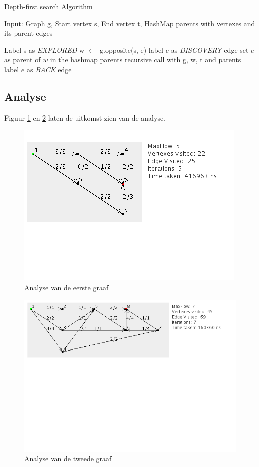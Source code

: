 \begin{algorithm}[h]
\caption{Depth-first search Algorithm}
\label{alg:DFS}
\begin{algorithmic}
\REQUIRE Input: Graph g, Start vertex s, End vertex t, HashMap parents with vertexes and its parent edges

\STATE Label s as \textit{EXPLORED}
\STATE w $\gets$ g.opposite(s, e)
\STATE label $e$ as \textit{DISCOVERY} edge
\STATE set $e$ as parent of $w$ in the hashmap parents
\STATE recursive call with g, w, t and parents
\ELSE
\STATE label $e$ as \textit{BACK} edge
\ENDIF
\ENDIF
\ENDFOR
\end{algorithmic}
\end{algorithm}

\subsection{Analyse}

Figuur \ref{fig:DFS_graph1} en \ref{fig:DFS_graph2} laten de uitkomst zien van de analyse.

\begin{figure}[h]
	\includegraphics[width=0.5\linewidth]{depthfirst/DFS_graph1}
	\centering
	\caption{Analyse van de eerste graaf}
	\label{fig:DFS_graph1}
\end{figure}

\begin{figure}[h]
	\includegraphics[width=0.5\linewidth]{depthfirst/DFS_graph2}
	\centering
	\caption{Analyse van de tweede graaf}
	\label{fig:DFS_graph2}
\end{figure}

